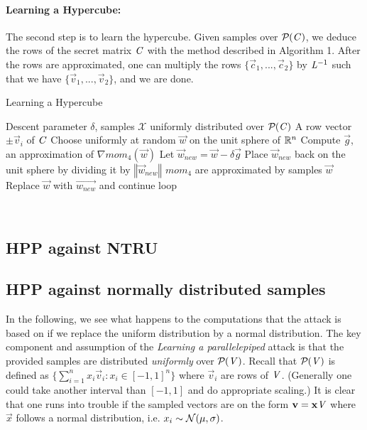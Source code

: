 \paragraph{Learning a Hypercube:}
The second step is to learn the hypercube. Given samples over $\mathcal{P}_{}(\mathit{C})$, we deduce the rows of the secret matrix $\mathit{C}$ with the method described in Algorithm 1. After the rows are approximated,
one can multiply the rows $\{\vec{c}_1, ..., \vec{c}_2\}$ by $\mathit{L}^{-1}$ such that we have $\{\vec{v}_1, ..., \vec{v}_2\}$, and we are done.
\begin{algorithm}
    \caption{Learning a Hypercube}
    \begin{algorithmic}
        \Require Descent parameter $\delta$, samples $\mathcal{X}$ uniformly distributed over $\mathcal{P}_{}(\mathit{C})$
        \Ensure A row vector $\pm \vec{v}_i$ of $\mathit{C}$
        \State Choose uniformly at random $\vec{w}$ on the unit sphere of $\mathbb{R}^n$
        \Loop
        \State Compute $\vec{g}$, an approximation of $\nabla mom_{4}(\vec{w})$
        \State Let $\vec{w}_{new} = \vec{w} - \delta \vec{g}$
        \State Place $\vec{w}_{new}$ back on the unit sphere by dividing it by $\left \Vert \vec{w}_{new} \right \Vert$
         \Comment $mom_4$ are approximated by samples 
            \State \Return $\vec{w}$
        \Else
            \State Replace $\vec{w}$ with $\vec{w_{new}}$ and continue loop
        \EndIf
        \EndLoop
    \end{algorithmic}
\end{algorithm}
\hfill \break \\
\subsection{HPP against NTRU}
\subsection{HPP against normally distributed samples}
In the following, we see what happens to the computations that the attack is based on if we replace the uniform distribution by a normal distribution.
The key component and assumption of the \textit{Learning a parallelepiped} attack is that the provided samples are distributed \textit{uniformly} over $\mathcal{P}_{}(\mathit{V})$.
Recall that $\mathcal{P}_{}(\mathit{V})$ is defined as $\{\sum_{i=1}^n x_i \vec{v}_i : x_i \in [-1, 1]^n\}$ where $\vec{v}_i$ are rows of $\mathit{V}$. (Generally one could take another interval than $[-1, 1]$ and do appropriate scaling.)
It is clear that one runs into trouble if the sampled vectors are on the form $\mathbf{v} = \mathbf{x} \mathit{V}$ where $\vec{x}$ follows a normal distribution, i.e. $x_i \sim \mathcal{N}(\mu, \sigma)$.

